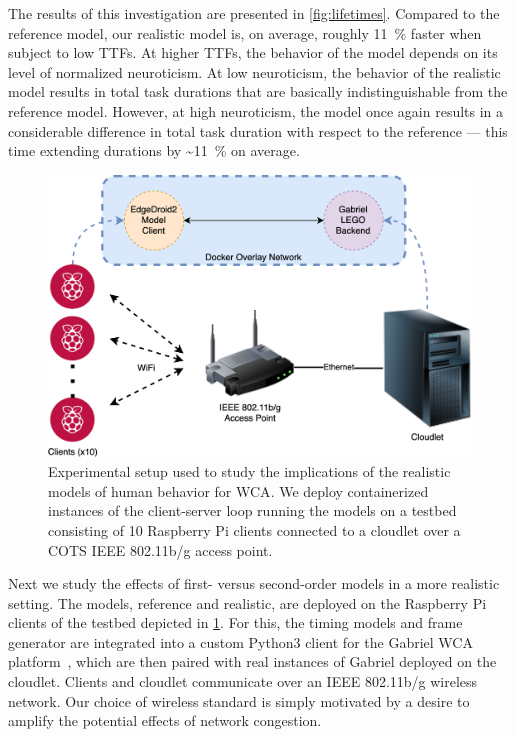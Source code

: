 The results of this investigation are presented in \cref{fig:lifetimes}.
Compared to the reference model, our realistic model is, on average, roughly \SI{11}{\percent} faster when subject to low \glspl{TTF}.
At higher \glspl{TTF}, the behavior of the model depends on its level of normalized neuroticism.
At low neuroticism, the behavior of the realistic model results in total task durations that are basically indistinguishable from the reference model.
However, at high neuroticism, the model once again results in a considerable difference in total task duration with respect to the reference --- this time extending durations by \textasciitilde\SI{11}{\percent} on average.

\begin{figure}
    \centering
    \includegraphics[width=.9\textwidth]{figs/EdgeDroid2ExperimentalSetup}
    \caption{%
        Experimental setup used to study the implications of the realistic models of human behavior for \gls{WCA}.
        We deploy containerized instances of the client-server loop running the models on a testbed consisting of \num{10} Raspberry Pi clients connected to a cloudlet over a \gls{COTS} \gls{IEEE} \num{802.11}b/g access point.
    }\label{fig:expsetup}
\end{figure}

Next we study the effects of first- versus second-order models in a more realistic setting.
The models, reference and realistic, are deployed on the Raspberry Pi clients of the testbed depicted in \cref{fig:expsetup}.
For this, the timing models and frame generator are integrated into a custom Python3 client for the Gabriel \gls{WCA} platform~\cite{chen2018application}, which are then paired with real instances of Gabriel deployed on the cloudlet.
Clients and cloudlet communicate over an \gls{IEEE} \num{802.11}b/g wireless network.
Our choice of wireless standard is simply motivated by a desire to amplify the potential effects of network congestion.

